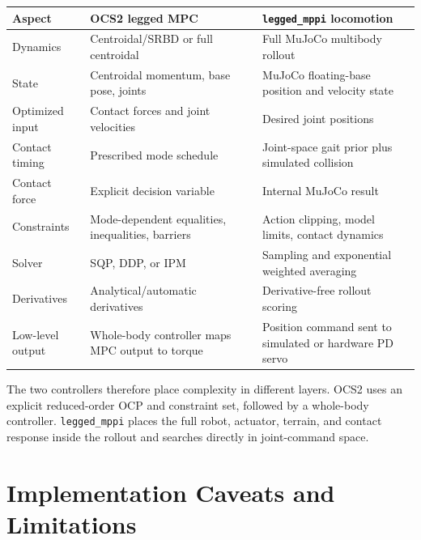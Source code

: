 \documentclass[11pt,a4paper]{article}
\newcommand{\code}[1]{\texttt{#1}}
\begin{document}
\begin{center}
\begin{tabular}{p{}p{}p{}}
\toprule
Aspect & OCS2 legged MPC & \code{legged\_mppi} locomotion\\
\midrule
Dynamics & Centroidal/SRBD or full centroidal & Full MuJoCo multibody rollout\\
State & Centroidal momentum, base pose, joints & MuJoCo floating-base position and velocity state\\
Optimized input & Contact forces and joint velocities & Desired joint positions\\
Contact timing & Prescribed mode schedule & Joint-space gait prior plus simulated collision\\
Contact force & Explicit decision variable & Internal MuJoCo result\\
Constraints & Mode-dependent equalities, inequalities, barriers & Action clipping, model limits, contact dynamics\\
Solver & SQP, DDP, or IPM & Sampling and exponential weighted averaging\\
Derivatives & Analytical/automatic derivatives & Derivative-free rollout scoring\\
Low-level output & Whole-body controller maps MPC output to torque & Position command sent to simulated or hardware PD servo\\
\bottomrule
\end{tabular}
\end{center}

The two controllers therefore place complexity in different layers.  OCS2
uses an explicit reduced-order OCP and constraint set, followed by a
whole-body controller.  \code{legged\_mppi} places the full robot, actuator,
terrain, and contact response inside the rollout and searches directly in
joint-command space.

\section{Implementation Caveats and Limitations}
\end{document}
